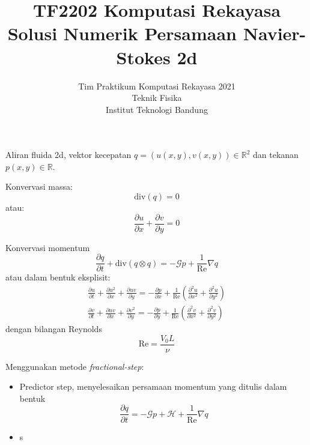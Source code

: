 \documentclass[a4paper,11pt,bahasa]{article} %
\begin{document}
\title{%
{\small TF2202 Komputasi Rekayasa}\\
Solusi Numerik Persamaan Navier-Stokes 2d
}
\author{Tim Praktikum Komputasi Rekayasa 2021\\
Teknik Fisika\\
Institut Teknologi Bandung}
\date{}
\maketitle

Aliran fluida 2d, vektor kecepatan
$q = ( u(x,y), v(x,y) ) \in \mathbb{R}^2$ dan tekanan $p(x,y) \in \mathbb{R}$.

Konvervasi massa:
\begin{equation}
\mathrm{div}(q) = 0
\end{equation}
atau:
\begin{equation}
\frac{\partial u}{\partial x} + \frac{\partial v}{\partial y} = 0
\end{equation}

Konvervasi momentum
\begin{equation}
\frac{\partial q}{\partial t} + \mathrm{div}(q \otimes q) =
-\mathcal{G}p + \frac{1}{\mathrm{Re}}\nabla q
\end{equation}
atau dalam bentuk eksplisit:
\begin{align}
\frac{\partial u}{\partial t} + \frac{\partial u^2}{\partial x} +
\frac{\partial uv}{\partial y} = -\frac{\partial p}{\partial x} +
\frac{1}{\mathrm{Re}}\left( \frac{\partial^2 u}{\partial x^2} +
\frac{\partial^2 u}{\partial y^2}
\right) \\
\frac{\partial v}{\partial t} + \frac{\partial uv}{\partial x} +
\frac{\partial v^2}{\partial y} = -\frac{\partial p}{\partial y} +
\frac{1}{\mathrm{Re}}\left( \frac{\partial^2 v}{\partial x^2} +
\frac{\partial^2 v}{\partial y^2}
\right)
\end{align}
dengan bilangan Reynolds
\begin{equation}
\mathrm{Re} = \frac{V_{0} L}{\nu}
\end{equation}

Menggunakan metode \textit{fractional-step}:
\begin{itemize}
\item Predictor step, menyelesaikan persamaan momentum yang ditulis dalam bentuk
\begin{equation}
\frac{\partial q}{\partial t} = -\mathcal{G}p + \mathcal{H} + \frac{1}{\mathrm{Re}}\nabla q
\end{equation}
\item s
\end{itemize}


\end{document}
